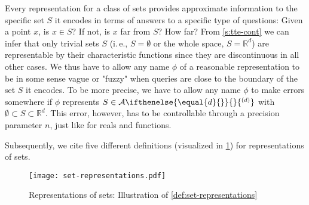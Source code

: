 \documentclass{CSML}
\newcommand{\representation}[2]{ #1\ifnotempty{#2}{^{(#2)}} }
\newcommand{\IR}{\mathbb{R}}
\newcommand{\Baire}{\Sigma^{\ast\ast}}
\newcommand{\closedset}[1][\empty]{ \representation{\mathcal{A}}{#1} }
\newcommand{\ifnotempty}[2]{ \ifthenelse{ \equal{#1}{\empty} }{}{#2} }
\newcommand{\ie}{\mbox{i.\,e.}\xspace}
\begin{document}
Every representation for a class of sets provides approximate
information to the specific set $S$ it encodes in terms of answers to a
specific type of questions:
Given a point $x$, is $x \in S$?
If not, is $x$ far from $S$? How far?
%
From \cref{s:tte-cont} we can infer that only trivial sets $S$ (\ie,
$S = \emptyset$ or the whole space, $S = \IR^d$) are representable by their
characteristic functions since they are discontinuous in all other cases.
We thus have to allow any name $\phi$ of a reasonable
representation to be in some sense vague or "fuzzy"
when queries are close to the boundary of the set $S$ it encodes.
To be more precise, we have to allow any name $\phi$ to make errors somewhere if
$\phi$ represents $S \in \closedset[d]$ with $\emptyset \subset S \subset \IR^d$.
This error, however, has to be controllable through a precision parameter $n$,
just like for reals and functions.


Subsequently, we cite five different definitions (visualized in
\cref{fig:set-representations}) for representations of sets.

\begin{figure}[htb]
	\centering
	\texttt{[image: set-representations.pdf]}
	\caption{Representations of sets: Illustration of \cref{def:set-representations}}
	\label{fig:set-representations}
\end{figure}
\end{document}
